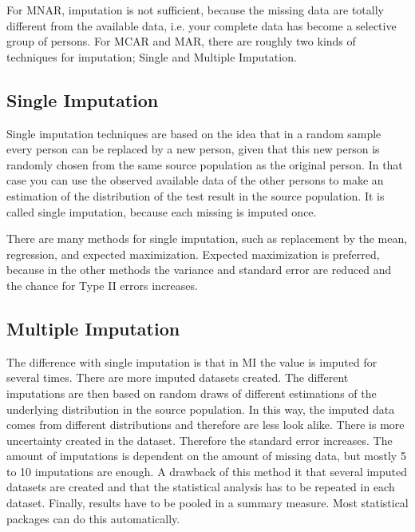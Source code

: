 \documentclass[12pt]{article} %
\begin{document}
For MNAR, imputation is not sufficient, because the missing data are totally different from the
available data, i.e. your complete data has become a selective group of persons. 
For MCAR and MAR, there are roughly two kinds of techniques for imputation; Single and Multiple
Imputation.

\subsection{Single Imputation}
Single imputation techniques are based on the idea that in a random sample every person can be
replaced by a new person, given that this new person is randomly chosen from the same source
population as the original person. In that case you can use the observed available data of the
other persons to make an estimation of the distribution of the test result in the source population.
It is called single imputation, because each missing is imputed once.

There are many methods for single imputation, such as replacement by the mean, regression,
and expected maximization. Expected maximization is preferred, because in the other methods
the variance and standard error are reduced and the chance for Type II errors increases. 
\subsection{Multiple Imputation}

The difference with single imputation is that in MI the value is imputed for several times. There are
more imputed datasets created. The different imputations are then based on random draws of
different estimations of the underlying distribution in the source population. In this way, the
imputed data comes from different distributions and therefore are less look alike. There is more
uncertainty created in the dataset. Therefore the standard error increases. The amount of
imputations is dependent on the amount of missing data, but mostly 5 to 10 imputations are
enough. A drawback of this method it that several imputed datasets are created and that the
statistical analysis has to be repeated in each dataset. Finally, results have to be pooled in a
summary measure. Most statistical packages can do this automatically.
\end{document}
